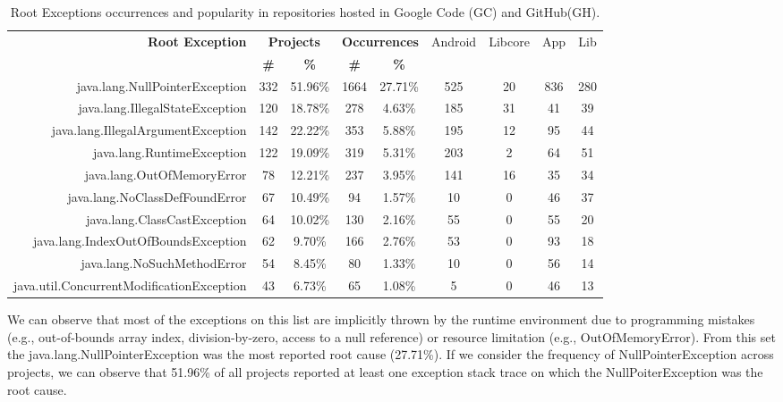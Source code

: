 \documentclass[conference]{IEEEtran}
\begin{document}
\begin{table}
  \centering
  \begin{tabular}{rcccccccc}
    \hline
    \bfseries{Root Exception} &  \multicolumn{2}{c}{\bfseries{Projects}} &  \multicolumn{2}{c}{\bfseries{Occurrences}} & \textsf{Android} & \textsf{Libcore} & \textsf{App} & \textsf{Lib} \\
    & \bfseries{\#} &  \bfseries{\%} & \bfseries{\# } & \bfseries{\% } &&&&\\
    \hline

java.lang.NullPointerException	&	332	&	51.96\%	&	1664	&	27.71\%	&	525	&	20	&	836	&	280	\\
java.lang.IllegalStateException	&	120	&	18.78\%	&	278	&	4.63\%	&	185	&	31	&	41	&	39	\\
java.lang.IllegalArgumentException	&	142	&	22.22\%	&	353	&	5.88\%	&	195	&	12	&	95	&	44	\\
java.lang.RuntimeException	&	122	&	19.09\%	&	319	&	5.31\%	&	203	&	2	&	64	&	51	\\
java.lang.OutOfMemoryError	&	78	&	12.21\%	&	237	&	3.95\%	&	141	&	16	&	35	&	34	\\
java.lang.NoClassDefFoundError	&	67	&	10.49\%	&	94	&	1.57\%	&	10	&	0	&	46	&	37	\\
java.lang.ClassCastException	&	64	&	10.02\%	&	130	&	2.16\%	&	55	&	0	&	55	&	20	\\
java.lang.IndexOutOfBoundsException	&	62	&	9.70\%	&	166	&	2.76\%	&	53	&	0	&	93	&	18	\\
java.lang.NoSuchMethodError	&	54	&	8.45\%	&	80	&	1.33\%	&	10	&	0	&	56	&	14	\\
java.util.ConcurrentModificationException	&	43	&	6.73\%	&	65	&	1.08\%	&	5	&	0	&	46	&	13	\\
    \hline
  \end{tabular}
\caption{Root Exceptions occurrences and popularity in repositories hosted in Google Code (GC) and GitHub(GH).}
\label{tab:topten}
\end{table}

 
We can observe that most of the exceptions on this list are implicitly thrown by the
 runtime environment due to programming mistakes  (e.g., out-of-bounds array index, division-by-zero, access to a null reference)
 or resource limitation (e.g., OutOfMemoryError). 
From this set the java.lang.NullPointerException was the most reported root cause (27.71\%). 
If we consider the frequency of NullPointerException 
across projects, we can observe that 51.96\% of all projects reported at least one exception stack 
trace on which the NullPoiterException was the root cause.
\end{document}

